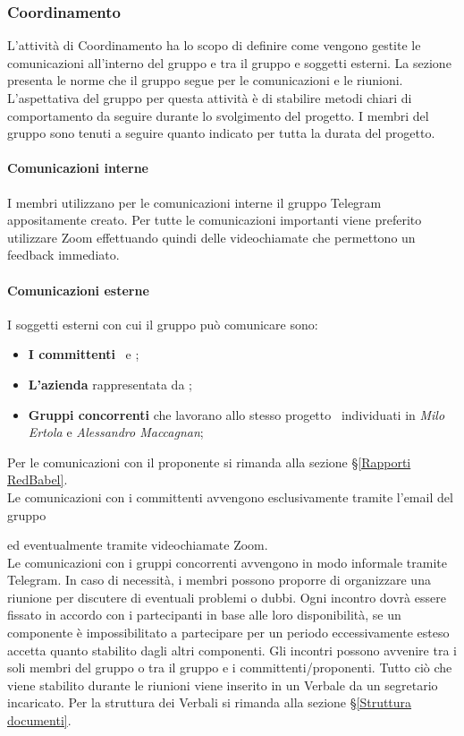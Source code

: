 
\subsubsection{Coordinamento}
\label{PO_Coordinamento_Scopo}
L'attività di Coordinamento ha lo scopo di definire come vengono gestite le comunicazioni all'interno del gruppo \Gruppo e tra il gruppo e soggetti esterni.
La sezione presenta le norme che il gruppo segue per le comunicazioni e le riunioni.
L'aspettativa del gruppo per questa attività è di stabilire metodi chiari di comportamento da seguire durante lo svolgimento del progetto.
 I membri del gruppo sono tenuti a seguire quanto indicato per tutta la durata del progetto.
\paragraph*{Comunicazioni interne}
I membri utilizzano per le comunicazioni interne il gruppo Telegram appositamente creato. Per tutte le comunicazioni importanti viene preferito utilizzare Zoom effettuando quindi delle videochiamate che permettono un feedback immediato.
\paragraph*{Comunicazioni esterne}
I soggetti esterni con cui il gruppo può comunicare sono: 
\begin{itemize}
	\item \textbf{I committenti} \VT\ e \CR;
	\item \textbf{L'azienda \Proponente} rappresentata da ;
	\item \textbf{Gruppi concorrenti} che lavorano allo stesso progetto \NomeProgetto\ individuati in \textit{Milo Ertola} e \textit{Alessandro Maccagnan};
\end{itemize}
Per le comunicazioni con il proponente si rimanda alla sezione \S\ref{Rapporti RedBabel}. \\
Le comunicazioni con i committenti avvengono esclusivamente tramite l'email del gruppo
\begin{center}
	 \textbf{\Mail} 
\end{center} ed eventualmente tramite videochiamate Zoom.\\
Le comunicazioni con i gruppi concorrenti avvengono in modo informale tramite Telegram.
In caso di necessità, i membri possono proporre di organizzare una riunione per discutere di eventuali problemi o dubbi. Ogni incontro dovrà essere fissato in accordo con i partecipanti in base alle loro disponibilità, se un componente è impossibilitato a partecipare per un periodo eccessivamente esteso accetta quanto stabilito dagli altri componenti. Gli incontri possono avvenire tra i soli membri del gruppo o tra il gruppo e i committenti/proponenti. 
Tutto ciò che viene stabilito durante le riunioni viene inserito in un Verbale da un segretario incaricato. Per la struttura dei Verbali si rimanda alla sezione \S\ref{Struttura documenti}.

